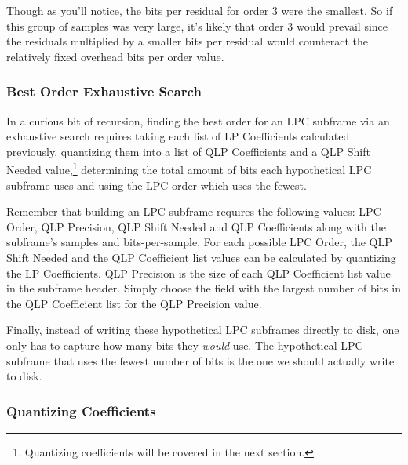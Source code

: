 Though as you'll notice, the bits per residual for order 3 were the smallest.
So if this group of samples was very large, it's likely that order 3
would prevail since the residuals multiplied by a smaller bits per residual
would counteract the relatively fixed overhead bits per order value.

\subsubsection{Best Order Exhaustive Search}

In a curious bit of recursion, finding the best order for an LPC subframe
via an exhaustive search requires taking each list of LP Coefficients
calculated previously, quantizing them into a list of QLP Coefficients
and a QLP Shift Needed value,\footnote{Quantizing coefficients will be covered in the next section.}
determining the total amount of bits each hypothetical LPC subframe
uses and using the LPC order which uses the fewest.

Remember that building an LPC subframe requires the following values:
LPC Order, QLP Precision, QLP Shift Needed and QLP Coefficients along
with the subframe's samples and bits-per-sample.
For each possible LPC Order, the QLP Shift Needed and the QLP Coefficient
list values can be calculated by quantizing the LP Coefficients.
QLP Precision is the size of each QLP Coefficient list value in the
subframe header.
Simply choose the field with the largest number of bits in the
QLP Coefficient list for the QLP Precision value.

Finally, instead of writing these hypothetical LPC subframes directly to disk,
one only has to capture how many bits they \textit{would} use.
The hypothetical LPC subframe that uses the fewest number of bits
is the one we should actually write to disk.

\pagebreak

\subsubsection{Quantizing Coefficients}

